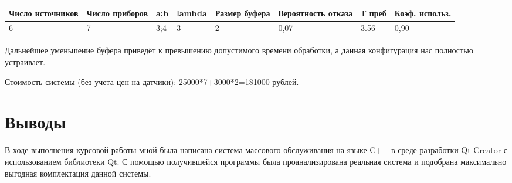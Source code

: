 \documentclass{article}
\begin{document}
	\begin{tabular}{|p{2.1cm}|p{2.1cm}|p{0.5cm}|p{2.1cm}|p{2.1cm}|p{2.1cm}|p{2.1cm}|p{2.1cm}|}
		\hline
		Число источников&Число приборов&a;b&lambda&Размер буфера&Вероятность отказа&Т преб&Коэф. использ.\\ \hline
		6&7&3;4&3&2&0,07&3.56&0,90\\ \hline
	\end{tabular}
	Дальнейшее уменьшение буфера приведёт к превышению допустимого времени обработки, а данная конфигурация нас полностью устраивает.
	
	Стоимость системы (без учета цен на датчики): 25000*7+3000*2=181000 рублей.\\
	\newpage
	\section{Выводы}
	В ходе выполнения курсовой работы мной была написана система массового обслуживания на языке C++ в среде разработки Qt Creator с использованием библиотеки Qt. С помощью получившейся программы была проанализирована реальная система и подобрана максимально выгодная комплектация данной системы.
	
	
	
	
	
	
\end{document}

